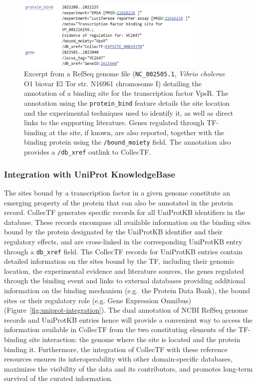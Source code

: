 \begin{figure}
  \centering
  \includegraphics[width=0.8\textwidth]{figures/chapter2/dbxref}
  \caption[Excerpt from a RefSeq genome file (\textit{Vibrio cholerae} O1
  biovar El Tor str. N16961 chromosome I).]{Excerpt from a RefSeq genome file
    (\texttt{NC\_002505.1}, \textit{Vibrio cholerae} O1 biovar El Tor
    str. N16961 chromosome I) detailing the annotation of a binding site for
    the transcription factor VpsR. The annotation using the
    \texttt{protein\_bind} feature details the site location and the
    experimental techniques used to identify it, as well as direct links to the
    supporting literature. Genes regulated through TF-binding at the site, if
    known, are also reported, together with the binding protein using the
    \texttt{/bound\_moiety} field. The annotation also provides a
    \texttt{/db\_xref} outlink to CollecTF.}
  \label{fig:dbxref}
\end{figure}

\subsubsection{Integration with UniProt KnowledgeBase}

The sites bound by a transcription factor in a given genome constitute an
emerging property of the protein that can also be annotated in the protein
record. CollecTF generates specific records for all UniProtKB identifiers in
the database. These records encompass all available information on the binding
sites bound by the protein designated by the UniProtKB identifier and their
regulatory effects, and are cross-linked in the corresponding UniProtKB entry
through a \verb|db_xref| field. The CollecTF records for UniProtKB entries
contain detailed information on the sites bound by the TF, including their
genomic location, the experimental evidence and literature sources, the genes
regulated through the binding event and links to external databases providing
additional information on the binding mechanism (e.g.\ the Protein Data Bank),
the bound sites or their regulatory role (e.g. Gene Expression
Omnibus)~\citep{berman2000protein, barrett2005ncbi}
(Figure~\ref{fig:uniprot-integration}). The dual annotation of NCBI RefSeq
genome records and UniProtKB entries hence will provide a convenient way to
access the information available in CollecTF from the two constituting elements
of the TF-binding site interaction: the genome where the site is located and
the protein binding it. Furthermore, the integration of CollecTF with these
reference resources ensures its interoperability with other domain-specific
databases, maximizes the visibility of the data and its contributors, and
promotes long-term survival of the curated information.

